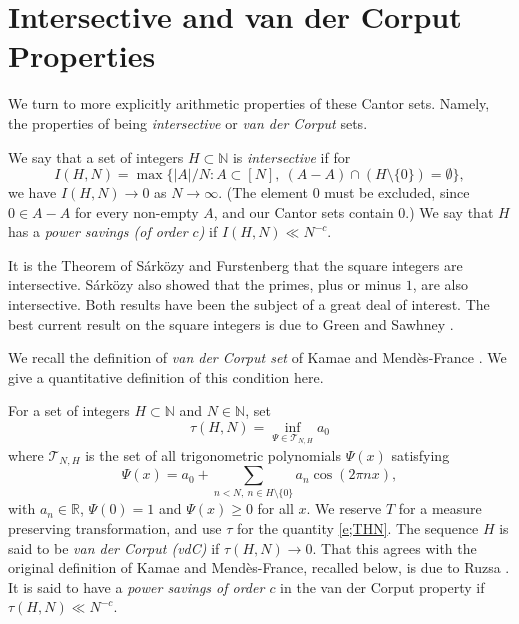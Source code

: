 \section{Intersective and van der Corput Properties } \label{sec;intersective}
We turn to more explicitly arithmetic properties of these Cantor sets. Namely, the properties of being \emph{intersective} or \emph{van der Corput} sets.  

\begin{definition}
    We say that a set of integers $H \subset \mathbb N $ is \emph{intersective} if for 
 \begin{equation} \label{eSmax}
     I (H,N) = \max 
     \{ \lvert A\rvert /N \colon A\subset  [N], \ (A-A) \cap (H\setminus\{0\}) = \emptyset\}, 
 \end{equation}
 we have $I (H,N) \to 0$ as $N\to \infty$.   
 (The element $0$ must be excluded, since $0\in A-A$ for every non-empty $A$, and our Cantor sets contain $0$.) 
 We say that $H$ has a \emph{power savings (of order $c$)} if $I (H,N)  \ll N ^{-c}$.
 \end{definition}

It is the Theorem of S\'ark\"ozy \cite{MR487031} and Furstenberg \cite{MR0498471} that the square integers are intersective. 
S\'ark\"ozy also showed that the primes, plus or minus $1$, are also intersective. 
Both results have been the subject of a great deal of interest.  The best current result on the square integers is due to Green and Sawhney \cite{green2025newboundsfurstenbergsarkozytheorem}.   
 

We recall the definition of \emph{van der Corput set} of Kamae and Mend\`es-France
\cite{MR0516154}.  We give a quantitative definition  of this condition here. 

\begin{definition} 
For a set of integers $H \subset \mathbb{N}$  and $N\in \mathbb{N}$, set  
\begin{equation}\label{e;THN}
    \tau(H,N) = \inf _{\Psi \in \mathcal{T}_{N,H}} a_0
\end{equation}
where $\mathcal{T}_{N,H}$ is the set of all trigonometric polynomials $\Psi(x)$ satisfying 
\begin{equation} \label{e:T}
    \Psi(x) = a_0 + \sum_{ n<N, \ n\in H\setminus\{0\}} a_n \cos(2\pi n x) , 
\end{equation}
with $a_n\in \mathbb R$, $\Psi(0)=1$ and $\Psi(x)\geq 0$ for all $x$. 
We reserve $T$ for a measure preserving transformation, and use $\tau$ for the quantity \eqref{e;THN}. 
The sequence $H$ is said to be \emph{van der Corput (vdC)} if $\tau(H,N) \to 0$. 
That this agrees with the original definition of Kamae and Mend\`es-France, recalled below, is due to Ruzsa \cite{Ruzsa1984}. 
It is said to have a \emph{power savings of order $c$} in the van der Corput property if $\tau(H,N) \ll N ^{-c}$.  
\end{definition}


